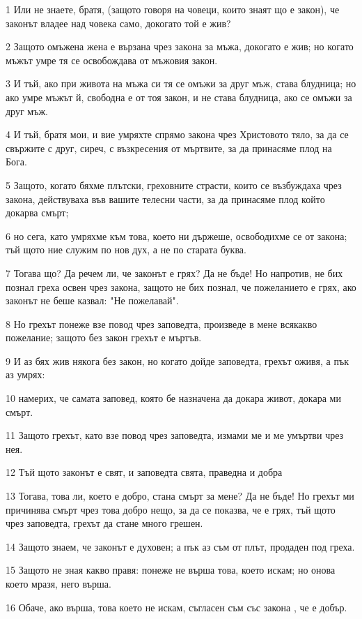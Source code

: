 \par 1 Или не знаете, братя, (защото говоря на човеци, които знаят що е закон), че законът владее над човека само, докогато той е жив?
\par 2 Защото омъжена жена е вързана чрез закона за мъжа, докогато е жив; но когато мъжът умре тя се освобождава от мъжовия закон.
\par 3 И тъй, ако при живота на мъжа си тя се омъжи за друг мъж, става блудница; но ако умре мъжът й, свободна е от тоя закон, и не става блудница, ако се омъжи за друг мъж.
\par 4 И тъй, братя мои, и вие умряхте спрямо закона чрез Христовото тяло, за да се свържите с друг, сиреч, с възкресения от мъртвите, за да принасяме плод на Бога.
\par 5 Защото, когато бяхме плътски, греховните страсти, които се възбуждаха чрез закона, действуваха във вашите телесни части, за да принасяме плод който докарва смърт;
\par 6 но сега, като умряхме към това, което ни държеше, освободихме се от закона; тъй щото ние служим по нов дух, а не по старата буква.
\par 7 Тогава що? Да речем ли, че законът е грях? Да не бъде! Но напротив, не бих познал греха освен чрез закона, защото не бих познал, че пожеланието е грях, ако законът не беше казвал: "Не пожелавай".
\par 8 Но грехът понеже взе повод чрез заповедта, произведе в мене всякакво пожелание; защото без закон грехът е мъртъв.
\par 9 И аз бях жив някога без закон, но когато дойде заповедта, грехът оживя, а пък аз умрях:
\par 10 намерих, че самата заповед, която бе назначена да докара живот, докара ми смърт.
\par 11 Защото грехът, като взе повод чрез заповедта, измами ме и ме умъртви чрез нея.
\par 12 Тъй щото законът е свят, и заповедта свята, праведна и добра
\par 13 Тогава, това ли, което е добро, стана смърт за мене? Да не бъде! Но грехът ми причинява смърт чрез това добро нещо, за да се показва, че е грях, тъй щото чрез заповедта, грехът да стане много грешен.
\par 14 Защото знаем, че законът е духовен; а пък аз съм от плът, продаден под греха.
\par 15 Защото не зная какво правя: понеже не върша това, което искам; но онова което мразя, него върша.
\par 16 Обаче, ако върша, това което не искам, съгласен съм със закона , че е добър.
